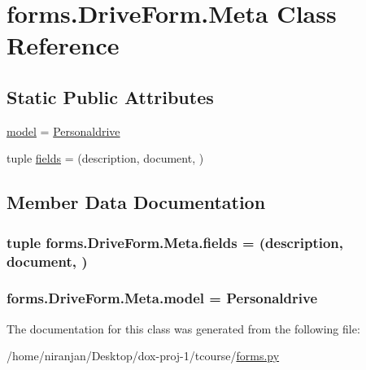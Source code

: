 \hypertarget{classforms_1_1_drive_form_1_1_meta}{}\section{forms.\+Drive\+Form.\+Meta Class Reference}
\label{classforms_1_1_drive_form_1_1_meta}
\subsection*{Static Public Attributes}
\begin{DoxyCompactItemize}
\item 
\hyperlink{classforms_1_1_drive_form_1_1_meta_a7cc781378860fc23a7d7832f7233b16a}{model} = \hyperlink{classmodels_1_1_personaldrive}{Personaldrive}
\item 
tuple \hyperlink{classforms_1_1_drive_form_1_1_meta_acd03fdc69850f3b34ed83cc2df575491}{fields} = (\textquotesingle{}description\textquotesingle{}, \textquotesingle{}document\textquotesingle{}, )
\end{DoxyCompactItemize}


\subsection{Member Data Documentation}
\subsubsection[{\texorpdfstring{fields}{fields}}]{\setlength{\rightskip}{0pt plus 5cm}tuple forms.\+Drive\+Form.\+Meta.\+fields = (\textquotesingle{}description\textquotesingle{}, \textquotesingle{}document\textquotesingle{}, )\hspace{0.3cm}{\ttfamily [static]}}\hypertarget{classforms_1_1_drive_form_1_1_meta_acd03fdc69850f3b34ed83cc2df575491}{}\label{classforms_1_1_drive_form_1_1_meta_acd03fdc69850f3b34ed83cc2df575491}
\subsubsection[{\texorpdfstring{model}{model}}]{\setlength{\rightskip}{0pt plus 5cm}forms.\+Drive\+Form.\+Meta.\+model = {\bf Personaldrive}\hspace{0.3cm}{\ttfamily [static]}}\hypertarget{classforms_1_1_drive_form_1_1_meta_a7cc781378860fc23a7d7832f7233b16a}{}\label{classforms_1_1_drive_form_1_1_meta_a7cc781378860fc23a7d7832f7233b16a}


The documentation for this class was generated from the following file\+:\begin{DoxyCompactItemize}
\item 
/home/niranjan/\+Desktop/dox-\/proj-\/1/tcourse/\hyperlink{forms_8py}{forms.\+py}\end{DoxyCompactItemize}
